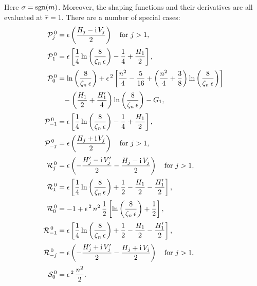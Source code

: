 \documentclass[12pt,prb,aps]{revtex4-1}
\begin{document}
Here $\sigma={\rm sgn}(m)$. Moreover, the shaping functions and their derivatives are all evaluated at $\hat{r}=1$. 
There are a number of special cases: 
\begin{align}
{\cal P}_j^{\,0} &= \epsilon\left(\frac{H_j-{\rm i}\,V_j}{2}\right)\mbox{~~~for $j>1$},\\[0.5ex]
{\cal P}_1^{\,0} &=\epsilon\left[\frac{1}{4}\ln\left(\frac{8}{\zeta_n\,\epsilon}\right)-\frac{1}{4}+\frac{H_1}{2}\right],\\[0.5ex]
{\cal P}_0^{\,0}  &= \ln\left(\frac{8}{\zeta_n\,\epsilon}\right)+\epsilon^{\,2}\left[\frac{n^2}{4} -\frac{5}{16} + \left(\frac{n^2}{4}+\frac{3}{8}\right)\ln\left(\frac{8}{\zeta_n\,\epsilon}\right)\right]\nonumber\\[0.5ex]
&\phantom{=}-\left(\frac{H_1}{2}+\frac{H_1'}{4}\right)\ln\left(\frac{8}{\zeta_n\,\epsilon}\right)-G_1,\\[0.5ex]
{\cal P}_{-1}^{\,0} &=\epsilon\left[\frac{1}{4}\ln\left(\frac{8}{\zeta_n\,\epsilon}\right)-\frac{1}{4}+\frac{H_1}{2}\right],\\[0.5ex]
{\cal P}_{-j}^{\,0}   &= \epsilon\left(\frac{H_j+{\rm i}\,V_j}{2}\right)\mbox{~~~for $j>1$},\\[0.5ex]
{\cal R}_j^{\,0}&= \epsilon\left(-\frac{H_j'-{\rm i}\,V_j'}{2}-\frac{H_j-{\rm i}\,V_j}{2}\right)\mbox{~~~for $j>1$},\\[0.5ex]
{\cal R}_1^{\,0} &=\epsilon\left[\frac{1}{4}\ln\left(\frac{8}{\zeta_n\,\epsilon}\right)+\frac{1}{2}-\frac{H_1}{2}-\frac{H_1'}{2}\right],\\[0.5ex]
{\cal R}_0^{\,0}  &= -1+\epsilon^{\,2}\,n^2\,\frac{1}{2}\left[\ln\left(\frac{8}{\zeta_n\,\epsilon}\right)+\frac{1}{2}\right],\\[0.5ex]
{\cal R}_{-1}^{\,0} &=\epsilon\left[\frac{1}{4}\ln\left(\frac{8}{\zeta_n\,\epsilon}\right)+\frac{1}{2}-\frac{H_1}{2}-\frac{H_1'}{2}\right],\\[0.5ex]
{\cal R}_{-j}^{\,0}   &= \epsilon\left(-\frac{H_j'+{\rm i}\,V_j'}{2}-\frac{H_j+{\rm i}\,V_j}{2}\right)\mbox{~~~for $j>1$},\\[0.5ex]
{\cal S}_0^{\,0} &= \epsilon^{\,2}\,\frac{n^2}{2}.
\end{align}
\end{document}
